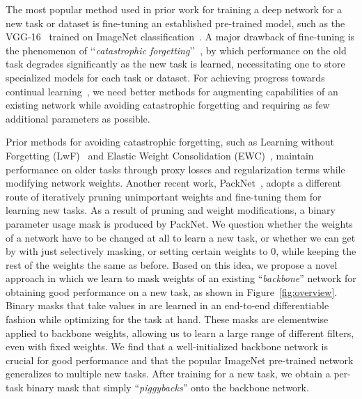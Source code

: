 \documentclass{llncs}
\begin{document}
The most popular method used in prior work for training a deep network for a new task or dataset is fine-tuning an established pre-trained model, such as the VGG-16~\cite{simonyan14VGG} trained on ImageNet classification~\cite{ILSVRC15}. A major drawback of fine-tuning is the phenomenon of \lq\lq\emph{catastrophic forgetting}\rq\rq~\cite{french1999catastrophic}, by which performance on the old task degrades significantly as the new task is learned, necessitating one to store specialized models for each task or dataset. For achieving progress towards continual learning~\cite{kirkpatrick2017overcoming,rannen2017encoder}, 
we need better methods for augmenting capabilities of an existing network 
while avoiding catastrophic forgetting and requiring as few additional parameters as possible.

Prior methods for avoiding catastrophic forgetting, such as Learning without Forgetting (LwF)~\cite{li2016learning} and Elastic Weight Consolidation (EWC)~\cite{kirkpatrick2017overcoming}, maintain performance on older tasks through proxy losses and regularization terms while modifying network weights. 
Another recent work, PackNet~\cite{mallya2017packnet}, adopts a different route of iteratively pruning unimportant weights and fine-tuning them for learning new tasks. 
As a result of pruning and weight modifications, a binary parameter usage mask is produced by PackNet.
We question whether the weights of a network have to be changed at all to learn a new task, or whether we can get by with just selectively masking, or setting certain weights to 0, while keeping the rest of the weights the same as before.
Based on this idea, we propose a novel approach in which we learn to mask weights of an existing ``\emph{backbone}'' network for obtaining good performance on a new task, as shown in Figure~\ref{fig:overview}. Binary masks that take values in  are learned in an end-to-end differentiable fashion while optimizing for the task at hand. These masks are elementwise applied to backbone weights, allowing us to learn a large range of different filters, even with fixed weights. 
We find that a well-initialized backbone network is crucial for good performance and that the popular ImageNet pre-trained network generalizes to multiple new tasks. 
After training for a new task, we obtain a per-task binary mask that simply ``\emph{piggybacks}'' onto the backbone network.
\end{document}
